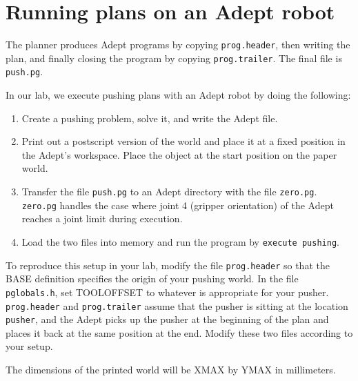 \section{Running plans on an Adept robot}
The planner produces Adept programs by copying {\tt prog.header},
then writing the plan, and finally closing the program by copying
{\tt prog.trailer}.  The final file is {\tt push.pg}.

In our lab, we execute pushing plans with an Adept robot by doing the
following:
\begin{enumerate}
\item Create a pushing problem, solve it, and write the Adept file.
\item Print out a postscript version of the world and place it at
a fixed position in the Adept's workspace.  Place the object at the
start position on the paper world.
\item Transfer the file {\tt push.pg} to an Adept directory with the
file {\tt zero.pg}.  {\tt zero.pg} handles the case where joint 4
(gripper orientation) of the Adept reaches a joint limit during execution.
\item Load the two files into memory and run the program by 
{\tt execute pushing}.  
\end{enumerate}

To reproduce this setup in your lab, modify the file {\tt prog.header}
so that the BASE definition specifies the origin of your pushing world.
In the file {\tt pglobals.h}, set TOOLOFFSET to whatever is appropriate
for your pusher.  {\tt prog.header} and {\tt prog.trailer} assume that
the pusher is sitting at the location {\tt pusher}, and the Adept picks
up the pusher at the beginning of the plan and places it back at the
same position at the end.  Modify these two files according to your 
setup.

The dimensions of the printed world will be XMAX by YMAX in millimeters.


